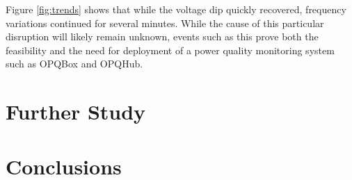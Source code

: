Figure \ref{fig:trends} shows that while the voltage dip quickly recovered, frequency variations continued for several minutes. While the cause of this particular disruption will likely remain
unknown, events such as this prove both the feasibility and the need for deployment of a power quality monitoring system such
as OPQBox and OPQHub.



\section{Further Study}\label{chap:further}
	
\section{Conclusions}
